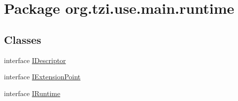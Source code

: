 \hypertarget{namespaceorg_1_1tzi_1_1use_1_1main_1_1runtime}{\section{Package org.\-tzi.\-use.\-main.\-runtime}
\label{namespaceorg_1_1tzi_1_1use_1_1main_1_1runtime}
}
\subsection*{Classes}
\begin{DoxyCompactItemize}
\item 
interface \hyperlink{interfaceorg_1_1tzi_1_1use_1_1main_1_1runtime_1_1_i_descriptor}{I\-Descriptor}
\item 
interface \hyperlink{interfaceorg_1_1tzi_1_1use_1_1main_1_1runtime_1_1_i_extension_point}{I\-Extension\-Point}
\item 
interface \hyperlink{interfaceorg_1_1tzi_1_1use_1_1main_1_1runtime_1_1_i_runtime}{I\-Runtime}
\end{DoxyCompactItemize}
